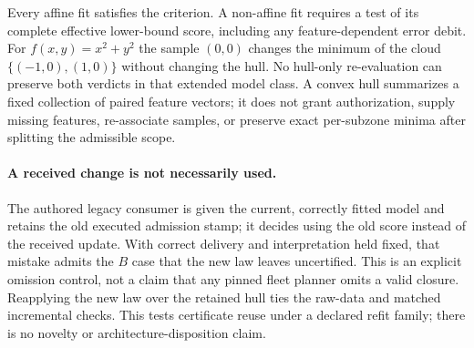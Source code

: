 \documentclass{article}
\begin{document}
Every affine fit satisfies the criterion. A non-affine fit requires a
test of its complete effective lower-bound score, including any
feature-dependent error debit. For $f(x,y)=x^2+y^2$ the sample $(0,0)$
changes the minimum of the cloud $\{(-1,0),(1,0)\}$ without changing
the hull. No hull-only re-evaluation can preserve both verdicts in
that extended model class. A convex hull summarizes a fixed collection
of paired feature vectors; it does not grant authorization, supply missing
features, re-associate samples, or preserve exact per-subzone minima
after splitting the admissible scope.

\paragraph{A received change is not necessarily used.}
The authored legacy consumer is given the current, correctly fitted model
and retains the old executed admission stamp; it decides using the old
score instead of the received update. With correct delivery and
interpretation held fixed, that mistake admits the $B$ case that the new
law leaves uncertified. This is an explicit omission control, not a
claim that any pinned fleet planner omits a valid closure. Reapplying the
new law over the retained hull ties the raw-data and matched incremental
checks. This tests certificate reuse under a declared refit family; there
is no novelty or architecture-disposition claim.
\end{document}
